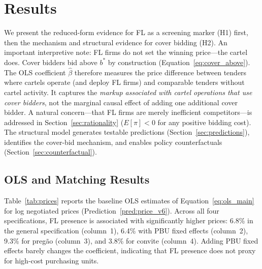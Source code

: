 
\section{Results}
\label{sec:results}

We present the reduced-form evidence for FL as a screening marker (H1)
first, then the mechanism and structural evidence for cover bidding
(H2). An important interpretive note: FL firms do not set the winning
price---the cartel does. Cover bidders bid above $b^*$ by construction
(Equation~\ref{eq:cover_above}). The OLS coefficient $\hat{\beta}$
therefore measures the price difference between tenders where cartels
operate (and deploy FL firms) and comparable tenders without cartel
activity. It captures the \emph{markup associated with cartel
operations that use cover bidders}, not the marginal causal effect of
adding one additional cover bidder. A natural concern---that FL firms
are merely inefficient competitors---is addressed in
Section~\ref{sec:rationality} ($E[\pi] < 0$ for any positive bidding
cost). The structural model generates testable predictions
(Section~\ref{sec:predictions}), identifies the cover-bid mechanism,
and enables policy counterfactuals
(Section~\ref{sec:counterfactual}).


\subsection{OLS and Matching Results}
\label{sec:results_ols}

Table~\ref{tab:prices} reports the baseline OLS estimates of
Equation~\eqref{eq:ols_main} for log negotiated prices
(Prediction~\ref{pred:price_v6}). Across all four
specifications, FL presence is associated with significantly higher
prices: 6.8\% in the general specification (column~1), 6.4\% with PBU
fixed effects (column~2), 9.3\% for preg\~ao (column~3), and 3.8\% for
convite (column~4). Adding PBU fixed effects barely changes the
coefficient, indicating that FL presence does not proxy for high-cost
purchasing units.


